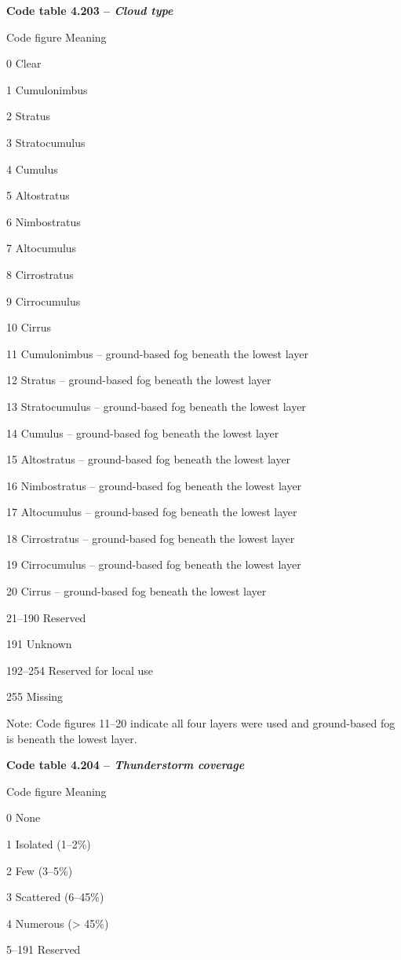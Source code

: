 \textbf{Code table 4.203 -- \emph{Cloud type}}

Code figure Meaning

0 Clear

1 Cumulonimbus

2 Stratus

3 Stratocumulus

4 Cumulus

5 Altostratus

6 Nimbostratus

7 Altocumulus

8 Cirrostratus

9 Cirrocumulus

10 Cirrus

11 Cumulonimbus -- ground-based fog beneath the lowest layer

12 Stratus -- ground-based fog beneath the lowest layer

13 Stratocumulus -- ground-based fog beneath the lowest layer

14 Cumulus -- ground-based fog beneath the lowest layer

15 Altostratus -- ground-based fog beneath the lowest layer

16 Nimbostratus -- ground-based fog beneath the lowest layer

17 Altocumulus -- ground-based fog beneath the lowest layer

18 Cirrostratus -- ground-based fog beneath the lowest layer

19 Cirrocumulus -- ground-based fog beneath the lowest layer

20 Cirrus -- ground-based fog beneath the lowest layer

21--190 Reserved

191 Unknown

192--254 Reserved for local use

255 Missing

Note: Code figures 11--20 indicate all four layers were used and ground-based fog is beneath the lowest layer.

\textbf{Code table 4.204 -- \emph{Thunderstorm coverage}}

Code figure Meaning

0 None

1 Isolated (1--2\%)

2 Few (3--5\%)

3 Scattered (6--45\%)

4 Numerous (\textgreater{} 45\%)

5--191 Reserved

